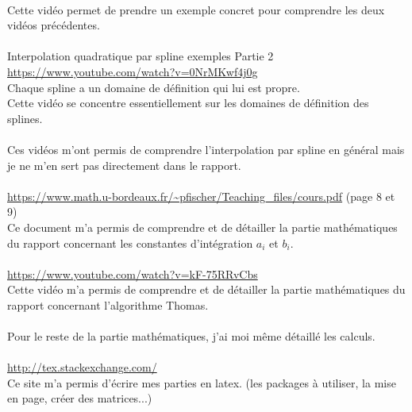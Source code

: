 \documentclass{article}
\begin{document}
\\
Cette vid\'{e}o permet de prendre un exemple concret pour comprendre les deux vid\'{e}os pr\'{e}c\'{e}dentes.
\\\\
Interpolation quadratique par spline exemples Partie 2
\\
{\color{blue}
\url{https://www.youtube.com/watch?v=0NrMKwf4j0g}} 
\\
Chaque spline a un domaine de d\'{e}finition qui lui est propre.
\\
Cette vid\'{e}o se concentre essentiellement sur les domaines de d\'{e}finition des splines.
\\\\
Ces vid\'{e}os m'ont permis de comprendre l'interpolation par spline en g\'{e}n\'{e}ral mais je ne m'en sert pas directement dans le rapport.
\\\\
{\color{blue}
\url{https://www.math.u-bordeaux.fr/~pfischer/Teaching_files/cours.pdf}} (page 8 et 9)
\\
Ce document m'a permis de comprendre et de d\'{e}tailler la partie math\'{e}matiques du rapport concernant les constantes d'int\'{e}gration $a_i$ et $b_i$.
\\\\
{\color{blue}
\url{https://www.youtube.com/watch?v=kF-75RRvCbs}} 
\\
Cette vid\'{e}o m'a permis de comprendre et de d\'{e}tailler la partie math\'{e}matiques du rapport concernant l'algorithme Thomas.
\\\\
Pour le reste de la partie math\'{e}matiques, j'ai moi m\^{e}me d\'{e}taill\'{e} les calculs.
\\\\
{\color{blue}
\url{http://tex.stackexchange.com/}}
\\
Ce site m'a permis d'\'{e}crire mes parties en latex. (les packages \`{a} utiliser, la mise en page, cr\'{e}er des matrices...)
\end{document}
